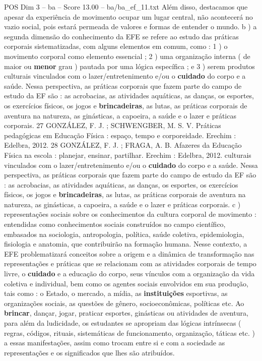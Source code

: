 \begin{textsample}{POS Dim 3 – ba – Score 13.00 – ba/ba\_ef\_11.txt}
Além disso, destacamos que apesar da experiência de movimento ocupar um lugar central, não acontecerá no vazio social, pois estará permeada de valores e formas de entender o mundo. b ) a segunda dimensão do conhecimento da EFE se refere ao estudo das práticas corporais sistematizadas, com alguns elementos em comum, como : 1 ) o movimento corporal como elemento essencial ; 2 ) uma organização interna ( de maior ou \textbf{menor} grau ) pautada por uma lógica específica ; e 3 ) serem produtos culturais vinculados com o lazer/entretenimento e/ou o \textbf{cuidado} do corpo e a saúde.
Nessa perspectiva, as práticas corporais que fazem parte do campo de estudo da EF são : as acrobacias, as atividades aquáticas, as danças, os esportes, os exercícios físicos, os jogos e \textbf{brincadeiras}, as lutas, as práticas corporais de aventura na natureza, as ginásticas, a capoeira, a saúde e o lazer e práticas corporais. 27 GONZÁLEZ, F.
J. ; SCHWENGBER, M.
S.
V.
Práticas pedagógicas em Educação Física : espaço, tempo e corporeidade.
Erechim : Edelbra, 2012. 28 GONZÁLEZ, F.
J. ; FRAGA, A.
B.
Afazeres da Educação Física na escola : planejar, ensinar, partilhar.
Erechim : Edelbra, 2012. culturais vinculados com o lazer/entretenimento e/ou o \textbf{cuidado} do corpo e a saúde.
Nessa perspectiva, as práticas corporais que fazem parte do campo de estudo da EF são : as acrobacias, as atividades aquáticas, as danças, os esportes, os exercícios físicos, os jogos e \textbf{brincadeiras}, as lutas, as práticas corporais de aventura na natureza, as ginásticas, a capoeira, a saúde e o lazer e práticas corporais. c ) representações sociais sobre os conhecimentos da cultura corporal de movimento : entendidas como conhecimentos sociais construídos no campo científico, embasados na sociologia, antropologia, política, saúde coletiva, epidemiologia, fisiologia e anatomia, que contribuirão na formação humana.
Nesse contexto, a EFE problematizará conceitos sobre a origem e a dinâmica de transformação nas representações e práticas que se relacionam com as atividades corporais de tempo livre, o \textbf{cuidado} e a educação do corpo, seus vínculos com a organização da vida coletiva e individual, bem como os agentes sociais envolvidos em sua produção, tais como : o Estado, o mercado, a mídia, as \textbf{instituições} esportivas, as organizações sociais, as questões de gênero, socioeconômicas, políticas etc.
Ao \textbf{brincar}, dançar, jogar, praticar esportes, ginásticas ou atividades de aventura, para além da ludicidade, os estudantes se apropriam das lógicas intrínsecas ( regras, códigos, rituais, sistemáticas de funcionamento, organização, táticas etc. ) a essas manifestações, assim como trocam entre si e com a sociedade as representações e os significados que lhes são atribuídos.

\end{textsample}
